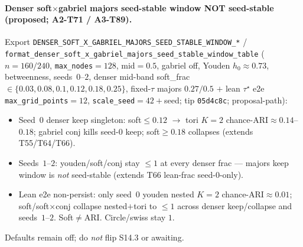 \documentclass[11pt]{article}
\begin{document}
\paragraph{Denser soft$\times$gabriel majors seed-stable window NOT
seed-stable (proposed; A2-T71 / A3-T89).}
Export
\texttt{DENSER\_SOFT\_X\_GABRIEL\_MAJORS\_SEED\_STABLE\_WINDOW\_*} /
\texttt{format\_denser\_soft\_x\_gabriel\_majors\_seed\_stable\_window\_table}
($n{=}160/240$, \texttt{max\_nodes}${=}128$, mid${=}0.5$, gabriel off,
Youden $h_0\approx 0.73$, betweenness, seeds~$0$--$2$, denser mid-band
soft\_frac$\in\{0.03,0.08,0.1,0.12,0.18,0.25\}$, fixed-$\tau$ majors
$0.27/0.5$ $+$ lean $\tau^\star$ e2e \texttt{max\_grid\_points}${=}12$,
\texttt{scale\_seed}${=}42{+}$seed; tip \texttt{05d4c8c}; proposal-path):
\begin{itemize}[leftmargin=1.5em]
  \item Seed~$0$ denser keep singleton: soft$\le 0.12$ $\to$ tori $K{=}2$
  chance-ARI$\approx 0.14$--$0.18$; gabriel conj kills seed-$0$ keep;
  soft$\ge 0.18$ collapses (extends T55/T64/T66).
  \item Seeds~$1$--$2$: youden/soft/conj stay $\le 1$ at every denser
  frac --- majors keep window is \emph{not} seed-stable (extends T66
  lean-frac seed-$0$-only).
  \item Lean e2e non-persist: only seed~$0$ youden nested $K{=}2$
  chance-ARI$\approx 0.01$; soft/soft$\times$conj collapse nested$+$tori
  to $\le 1$ across denser keep/collapse and seeds~$1$--$2$. Soft$\neq$ARI.
  Circle/swiss stay $1$.
\end{itemize}
Defaults remain off; do \emph{not} flip S14.3 or awaiting.
\end{document}
